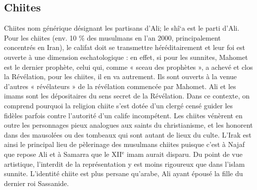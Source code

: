 \subsection{Chiites}
Chiites nom générique désignant les partisans
d’Ali; le shî\textquoteleft a est le parti d’Ali.
Pour les chiites (env. 10 \% des musulmans
en l’an 2000, principalement concentrés en
Iran), le califat doit se transmettre héréditairement
et leur foi est ouverte à une
dimension eschatologique : en effet, si
pour les sunnites, Mahomet est le dernier
prophète, celui qui, comme « sceau des
prophètes », a achevé et clos la Révélation,
pour les chiites, il en va autrement.
Ils sont ouverts à la venue d’autres « révélateurs »
de la révélation commencée par
Mahomet. Ali et les imams sont les dépositaires
du sens secret de la Révélation.
Dans ce contexte, on comprend pourquoi
la religion chiite s’est dotée d’un clergé
censé guider les fidèles parfois contre
l'autorité d’un calife incompétent. Les
chiites vénèrent en outre les personnages
pieux analogues aux saints du christianisme,
et les honorent dans des mausolées
ou des tombeaux qui sont autant de lieux
du culte. L’Irak est ainsi le principal lieu
de pèlerinage des musulmans chiites
puisque c’est à Najaf que repose Ali et à
Samarra que le XII$^\text{e}$ imam aurait disparu.
Du point de vue artistique, l’interdit de la
représentation y est moins rigoureux que
dans l'islam sunnite. L'identité chiite est
plus persane qu’arabe, Ali ayant épousé
la fille du dernier roi Sassanide.


  
